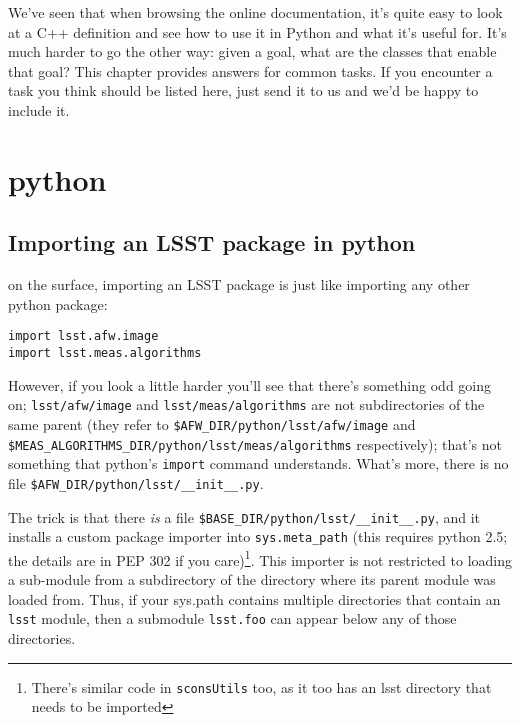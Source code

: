 
We've seen that when browsing the online documentation, it's quite
easy to look at a C++ definition and see how to use it in Python and
what it's useful for.  It's much harder to go the other way: given a
goal, what are the classes that enable that goal?  This chapter
provides answers for common tasks. If you encounter a task you think
should be listed here, just send it to us and we'd be happy to include
it.

\section{python}

\subsection{Importing an LSST package in python}

on the surface, importing an LSST package is just like importing any other python package:
\begin{verbatim}
import lsst.afw.image
import lsst.meas.algorithms
\end{verbatim}

However, if you look a little harder you'll see that there's something odd going on; \verb|lsst/afw/image| and
\verb|lsst/meas/algorithms| are not subdirectories of the same parent (they refer to
\verb|$AFW_DIR/python/lsst/afw/image| and \linebreak[0]\verb|$MEAS_ALGORITHMS_DIR/python/lsst/meas/algorithms| respectively);
that's not something that python's \verb|import| command understands.  What's more, there is no file
\verb|$AFW_DIR/python/lsst/__init__.py|.

The trick is that there \textit{is} a file \verb|$BASE_DIR/python/lsst/__init__.py|, and it installs a custom
package importer into \verb|sys.meta_path| (this requires python 2.5; the details are in PEP 302 if you care)\footnote{There's similar code in \texttt{sconsUtils} too, as it too has an lsst directory that needs to be imported}.
This importer is not restricted to loading a sub-module from a subdirectory of the directory where its parent
module was loaded from.  Thus, if your sys.path contains multiple directories that contain an \verb|lsst|
module, then a submodule \verb|lsst.foo| can appear below any of those directories.

